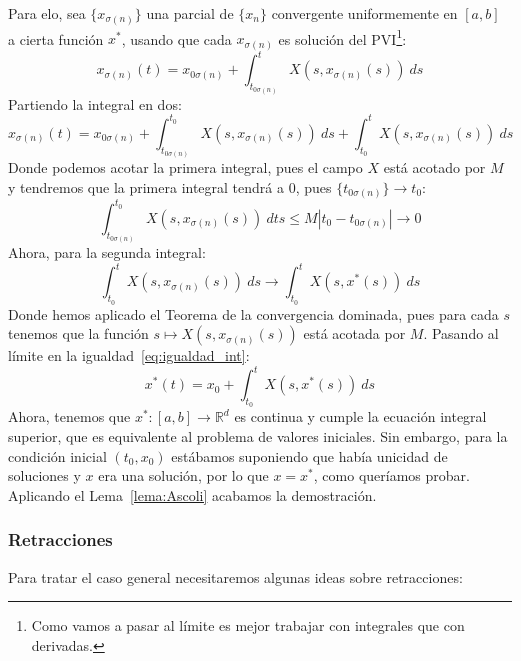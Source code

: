 \noindent
Para elo, sea $\{x_{\sigma(n)}\}$ una parcial de $\{x_n\}$ convergente uniformemente en $[a,b]$ a cierta función $x^\ast$, usando que cada $x_{\sigma(n)}$ es solución del PVI\footnote{Como vamos a pasar al límite es mejor trabajar con integrales que con derivadas.}:
\begin{equation*}
    x_{\sigma(n)}(t) = x_{0\sigma(n)} + \int_{t_{0\sigma(n)}}^{t} X(s,x_{\sigma(n)}(s))~ds 
\end{equation*}
Partiendo la integral en dos:
\begin{equation}\label{eq:igualdad_int}
    x_{\sigma(n)}(t) = x_{0\sigma(n)} + \int_{t_{0\sigma(n)}}^{t_0} X(s,x_{\sigma(n)}(s))~ds  + \int_{t_0}^{t} X(s,x_{\sigma(n)}(s))~ds 
\end{equation}
Donde podemos acotar la primera integral, pues el campo $X$ está acotado por $M$ y tendremos que la primera integral tendrá a $0$, pues $\{t_{0\sigma(n)}\}\to t_0$:
\begin{equation*}
    \int_{t_{0\sigma(n)}}^{t_0} X(s,x_{\sigma(n)}(s))~dts \leq M|t_0 - t_{0\sigma(n)}| \to 0
\end{equation*}
Ahora, para la segunda integral:
\begin{equation*}
    \int_{t_0}^{t} X(s,x_{\sigma(n)}(s))~ds  \to \int_{t_0}^{t} X(s,x^\ast(s))~ds 
\end{equation*}
Donde hemos aplicado el Teorema de la convergencia dominada, pues para cada $s$ tenemos que la función $s\mapsto X(s,x_{\sigma(n)}(s))$ está acotada por $M$. Pasando al límite en la igualdad~\ref{eq:igualdad_int}:
\begin{equation*}
    x^{\ast}(t) = x_0 + \int_{t_0}^{t} X(s,x^{\ast}(s))~ds 
\end{equation*}
Ahora, tenemos que $x^\ast:[a,b]\to \mathbb{R}^d$ es continua y cumple la ecuación integral superior, que es equivalente al problema de valores iniciales. Sin embargo, para la condición inicial $(t_0,x_0)$ estábamos suponiendo que había unicidad de soluciones y $x$ era una solución, por lo que $x=x^\ast$, como queríamos probar. Aplicando el Lema~\ref{lema:Ascoli} acabamos la demostración.\\

\subsubsection{Retracciones}
\noindent
Para tratar el caso general necesitaremos algunas ideas sobre retracciones:

